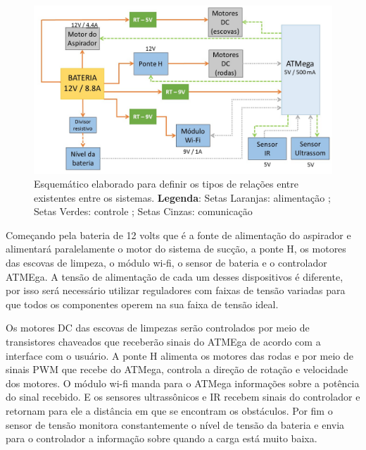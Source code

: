 		\begin{figure}[H]                                                           
      		\centering                                                                
      		\includegraphics[scale=0.5]{figuras/Planejamento_robo.jpg}               
      		\caption{Esquemático elaborado para definir os tipos de relações entre existentes entre os sistemas. \textbf{Legenda}: Setas Laranjas: alimentação ; Setas Verdes: controle ; Setas Cinzas: comunicação}    
      		\label{img:planejamento_robo}                                            
    	\end{figure} 

    	Começando pela bateria de 12 volts que é a fonte de alimentação do aspirador e alimentará paralelamente o motor do sistema de sucção, a ponte H, os motores das escovas de limpeza, o módulo wi-fi, o sensor de bateria e o controlador ATMEga. A tensão de alimentação de cada um desses dispositivos é diferente, por isso será necessário utilizar reguladores com faixas de tensão variadas para que todos os componentes operem na sua faixa de tensão ideal.

    	Os motores DC das escovas de limpezas serão controlados por meio de transistores chaveados que receberão sinais do ATMEga de acordo com a interface com o usuário. A ponte H alimenta os motores das rodas e por meio de sinais PWM que recebe do ATMega, controla a direção de rotação e velocidade dos motores. O módulo wi-fi manda para o ATMega informações sobre a potência do sinal recebido. E os sensores ultrassônicos e IR recebem sinais do controlador e retornam para ele a distância em que se encontram os obstáculos. Por fim o sensor de tensão monitora constantemente o nível de tensão da bateria e envia para o controlador a informação sobre quando a carga está muito baixa.

